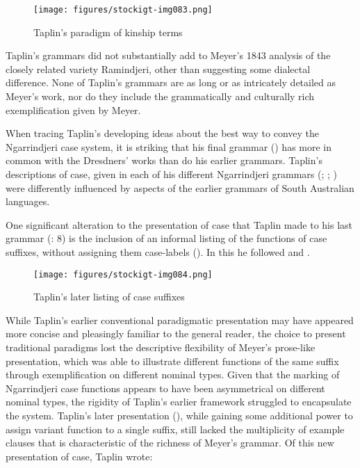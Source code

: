 \begin{figure}
\texttt{[image: figures/stockigt-img083.png]}
\caption{Taplin’s paradigm of kinship terms \citeyearpar[10]{taplin_grammar_1878}}
\label{bkm:Ref456016447}\label{fig:key:7-136}
\end{figure}

Taplin’s grammars did not substantially add to Meyer’s 1843 analysis of the closely related variety Ramindjeri, other than suggesting some dialectal difference. None of Taplin’s grammars are as long or as intricately detailed as Meyer’s work, nor do they include the grammatically and culturally rich exemplification given by Meyer.

When tracing Taplin’s developing ideas about the best way to convey the Ngarrindjeri case system, it is striking that his final grammar (\citeyear{taplin_grammar_1878}) has more in common with the Dresdners' works than do his earlier grammars. Taplin’s descriptions of case, given in each of his different Ngarrindjeri grammars (\citeyear{taplin_vocabulary_1867}; \citeyear{taplin_notes_1872}; \citeyear{taplin_grammar_1878}) were differently influenced by aspects of the earlier grammars of South Australian languages.

One significant alteration to the presentation of case that Taplin made to his last grammar (\citeyear{taplin_grammar_1878}: 8) is the inclusion of an informal listing of the functions of case suffixes, without assigning them case-labels (). In this he followed \citet{meyer_vocabulary_1843} and \citet{schurmann_letter_1844}.


\begin{figure}
\texttt{[image: figures/stockigt-img084.png]}
\caption{Taplin’s later listing of case suffixes \citeyearpar[8]{taplin_grammar_1878}}
\label{bkm:Ref456016469}\label{fig:key:7-137}
\end{figure}

While Taplin’s earlier conventional paradigmatic presentation may have appeared more concise and pleasingly familiar to the general reader, the choice to present traditional paradigms lost the descriptive flexibility of Meyer’s prose-like presentation, which was able to illustrate different functions of the same suffix through exemplification on different nominal types. Given that the marking of Ngarrindjeri case functions appears to have been asymmetrical on different nominal types, the rigidity of Taplin’s earlier framework struggled to encapsulate the system. Taplin’s later presentation (), while gaining some additional power to assign variant function to a single suffix, still lacked the multiplicity of example clauses that is characteristic of the richness of Meyer’s grammar. Of this new presentation of case, Taplin wrote:

